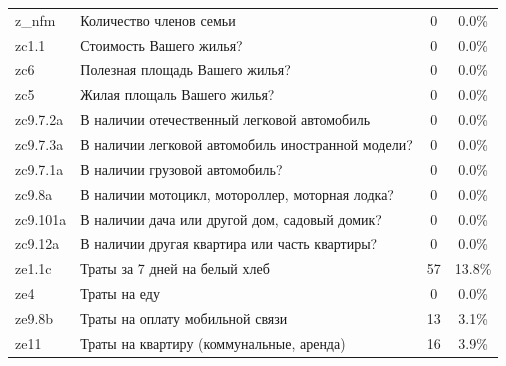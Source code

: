 \documentclass[12pt]{report}
\begin{document}
\begin{longtable}{llcc}
  \bottomrule
  \endlastfoot
     z\_nfm &                                                                              Количество членов семьи &                                0 &                      0.0\% \\
     zc1.1 &                                  Стоимость Вашего жилья? &                                0 &                      0.0\% \\
       zc6 & Полезная площадь Вашего жилья? &                                0 &                      0.0\% \\
       zc5 & Жилая площаль Вашего жилья? &                                0 &                      0.0\% \\
  zc9.7.2a &                                                         В наличии отечественный легковой автомобиль &                                0 &                      0.0\% \\
  zc9.7.3a &                                                  В наличии легковой автомобиль иностранной модели?  &                                0 &                      0.0\% \\
  zc9.7.1a &                                                                      В наличии грузовой автомобиль? &                                0 &                      0.0\% \\
    zc9.8a &                                                     В наличии мотоцикл, мотороллер, моторная лодка? &                                0 &                      0.0\% \\
  zc9.101a &                                           В наличии дача или другой дом, садовый домик? &                                0 &                      0.0\% \\
   zc9.12a &                                                       В наличии другая квартира или часть квартиры? &                                0 &                      0.0\% \\
    ze1.1c &                  Траты за 7 дней на белый хлеб &                               57 &                     13.8\% \\
       ze4 & Траты на еду &                                0 &                      0.0\% \\
    ze9.8b &                        Траты на оплату мобильной связи  &                               13 &                      3.1\% \\
      ze11 & Траты на квартиру (коммунальные, аренда) &                               16 &                      3.9\% \\

\end{longtable}
\end{document}
